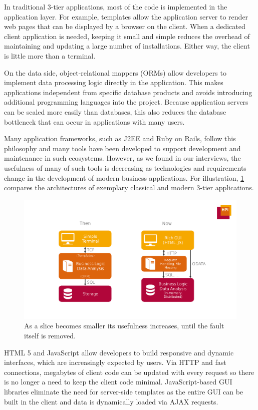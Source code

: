 In traditional 3-tier applications, most of the code is implemented in the application layer.
For example, templates allow the application server to render web pages that can be displayed by a browser on the client.
When a dedicated client application is needed, keeping it small and simple reduces the overhead of maintaining and updating a large number of installations.
Either way, the client is little more than a terminal.

On the data side, object-relational mappers (ORMs) allow developers to implement data processing logic directly in the application.
This makes applications independent from specific database products and avoids introducing additional programming languages into the project.
Because application servers can be scaled more easily than databases, this also reduces the database bottleneck that can occur in applications with many users.

Many application frameworks, such as J2EE and Ruby on Rails, follow this philosophy and many tools have been developed to support development and maintenance in such ecosystems.
However, as we found in our interviews, the usefulness of many of such tools is decreasing as technologies and requirements change in the development of modern business applications.
For illustration, \cref{fig:3tier-changes} compares the architectures of exemplary classical and modern 3-tier applications.

\begin{figure}[t]
\centering
\includegraphics[width=.9\linewidth]{img/3tier-changes}
\caption{As a slice becomes smaller its usefulness increases, until the fault itself is removed.}
\label{fig:3tier-changes}
\end{figure}

HTML 5 and JavaScript allow developers to build responsive and dynamic interfaces, which are increasingly expected by users.
Via HTTP and fast connections, megabytes of client code can be updated with every request so there is no longer a need to keep the client code minimal.
JavaScript-based GUI libraries eliminate the need for server-side templates as the entire GUI can be built in the client and data is dynamically loaded via AJAX requests.

